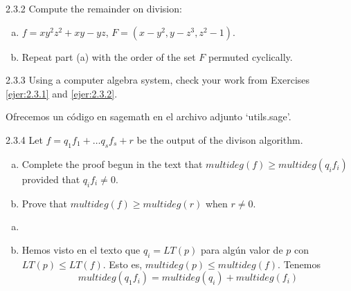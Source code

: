 \documentclass[twoside]{article}
\begin{document}
\begin{ejercicio}{2.3.2}
Compute the remainder on division:
\begin{enumerate}[a.]
\item $f = xy^2z^2 + xy - yz$, $F = (x-y^2, y-z^3, z^2-1)$.
\item Repeat part (a) with the order of the set $F$ permuted cyclically.
\end{enumerate}
\end{ejercicio}

\newpage

\begin{ejercicio}{2.3.3}
Using a computer algebra system, check your work from Exercises \ref{ejer:2.3.1} and \ref{ejer:2.3.2}.
\end{ejercicio}
\begin{solucion}
Ofrecemos un código en sagemath en el archivo adjunto `utils.sage'.
\end{solucion}

\newpage

\begin{ejercicio}{2.3.4}
Let $f = q_1 f_1 + \dots q_s f_s + r$ be the output of the divison algorithm.
\begin{enumerate}[a.]
\item Complete the proof begun in the text that $multideg(f) ≥ multideg(q_i f_i)$ provided that $q_i f_i \neq 0$.
\item Prove that $multideg(f) ≥ multideg(r)$ when $r \neq 0$.
\end{enumerate}
\begin{solucion}
\begin{enumerate}[a.]
\item[]
\item Hemos visto en el texto que $q_i =LT(p)$ para algún valor de $p$ con $LT(p)\leq LT(f)$. Esto es, $multideg(p) \leq multideg(f)$. Tenemos
$$multideg(q_1 f_i) =multideg(q_i)+multideg(f_i)$$

\end{enumerate}
\end{solucion}
\end{ejercicio}

\newpage
\end{document}
